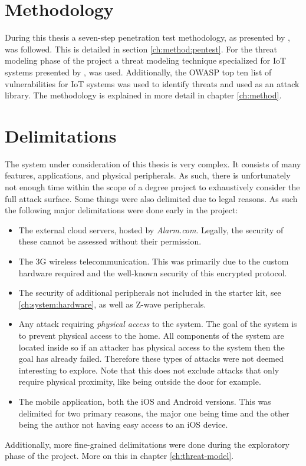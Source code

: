 \section{Methodology} \label{ch:intro:methodology}
During this thesis a seven-step penetration test methodology, as presented by \citeauthor{weidman2014} \cite{weidman2014}, was followed. This is detailed in section \ref{ch:method:pentest}. For the threat modeling phase of the project a threat modeling technique specialized for IoT systems presented by \citeauthor{guzman2017iot} \cite{guzman2017iot}, was used. Additionally, the OWASP top ten list of vulnerabilities for IoT systems \cite{owasp-iot-top10} was used to identify threats and used as an attack library. The methodology is explained in more detail in chapter \ref{ch:method}.

\section{Delimitations} \label{ch:intro:delimitations}
The system under consideration of this thesis is very complex. It consists of many features, applications, and physical peripherals. As such, there is unfortunately not enough time within the scope of a degree project to exhaustively consider the full attack surface. Some things were also delimited due to legal reasons. As such the following major delimitations were done early in the project:

\begin{itemize}
    \item The external cloud servers, hosted by \textit{Alarm.com}. Legally, the security of these cannot be assessed without their permission.
    \item The 3G wireless telecommunication. This was primarily due to the custom hardware required and the well-known security of this encrypted protocol.
    \item The security of additional peripherals not included in the starter kit, see \ref{ch:system:hardware}, as well as Z-wave peripherals.
    \item Any attack requiring \textit{physical access} to the system. The goal of the system is to prevent physical access to the home. All components of the system are located inside so if an attacker has physical access to the system then the goal has already failed. Therefore these types of attacks were not deemed interesting to explore. Note that this does not exclude attacks that only require physical proximity, like being outside the door for example.
    \item The mobile application, both the iOS and Android versions. This was delimited for two primary reasons, the major one being time and the other being the author not having easy access to an iOS device.
\end{itemize}
Additionally, more fine-grained delimitations were done during the exploratory phase of the project. More on this in chapter \ref{ch:threat-model}.

